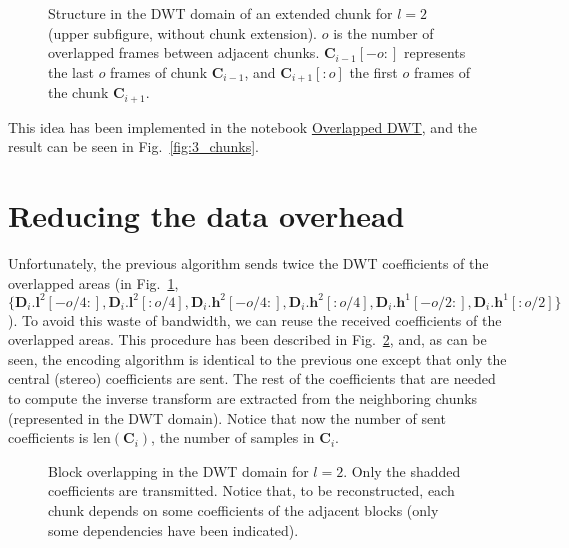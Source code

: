
\begin{figure}
  \centering
  \caption{Structure in the DWT domain of an extended chunk for $l=2$
    (upper subfigure, without chunk extension). $o$ is the number of
    overlapped frames between adjacent chunks.
    ${\mathbf C}_{i-1}[-o:]$ represents the last $o$ frames of chunk
    ${\mathbf C}_{i-1}$, and ${\mathbf C}_{i+1}[:o]$ the first $o$
    frames of the chunk ${\mathbf C}_{i+1}$.}
  \label{fig:subbands}
\end{figure}

This idea has been implemented in the notebook
\href{https://github.com/Tecnologias-multimedia/Tecnologias-multimedia.github.io/blob/master/contents/transform_coding/overlapped_DWT_I.ipynb}{Overlapped
  DWT}, and the result can be seen in Fig.~\ref{fig:3_chunks}.


\section{Reducing the data overhead}

\label{sec:reducing}

Unfortunately, the previous algorithm sends twice the DWT coefficients
of the overlapped areas (in Fig.~\ref{fig:subbands}, $\{{\mathbf
  D}_i.{\mathbf l}^2[-o/4:], {\mathbf D}_i.{\mathbf l}^2[:o/4],
{\mathbf D}_i.{\mathbf h}^2[-o/4:], {\mathbf D}_i.{\mathbf
  h}^2[:o/4], {\mathbf D}_i.{\mathbf h}^1[-o/2:], {\mathbf
  D}_i.{\mathbf h}^1[:o/2]\}$). To avoid this waste of bandwidth, we
can reuse the received coefficients of the overlapped areas. This
procedure has been described in Fig.~\ref{fig:overlapping}, and,
as can be seen, the encoding algorithm is identical to the previous
one except that only the central (stereo) coefficients are
sent. The rest of the coefficients that are needed to compute the inverse
transform are extracted from the neighboring chunks (represented in the
DWT domain). Notice that now the number of sent coefficients is
$\text{len}({\mathbf C}_i)$, the number of samples in ${\mathbf C}_i$.

\begin{figure}
  \centering
  \caption{Block overlapping in the DWT domain for $l=2$. Only the
    shadded coefficients are transmitted. Notice that, to be
    reconstructed, each chunk depends on some coefficients of the
    adjacent blocks (only some dependencies have been indicated).}
  \label{fig:overlapping}
\end{figure}


